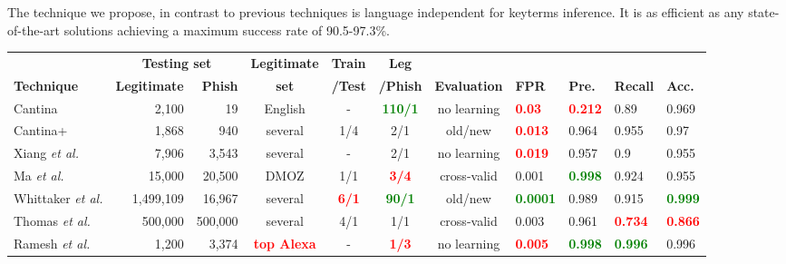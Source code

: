\documentclass[10pt,conference,compsocconf,letterpaper]{IEEEtran}
\begin{document}
The technique we propose, in contrast to previous techniques is language independent for keyterms inference. It is as efficient as any state-of-the-art solutions achieving a maximum success rate of 90.5-97.3\%.
\fi





\else

\begin{table*}[tbh]
\centering
\begin{tabular}{l r r c c c c l l l l }
& \multicolumn{2}{c}{\textbf{Testing set}} & \textbf{Legitimate} & \textbf{Train} & \textbf{Leg} & & & & & \\
\textbf{Technique} &  \textbf{Legitimate} & \textbf{Phish} & \textbf{set} & \textbf{/Test} & \textbf{/Phish}  & \textbf{Evaluation}  & \textbf{FPR}  & \textbf{Pre.} & \textbf{Recall} & \textbf{Acc.}\\ \hline
Cantina \cite{zhang:2007:cantina} & 2,100 & 19 & English & - & \textbf{\textcolor{green}{110/1}} & no learning & \textbf{\textcolor{red}{0.03}} & \textbf{\textcolor{red}{0.212}} & 0.89 & 0.969 \\
Cantina+ \cite{xiang:2011:cantina} & 1,868 & 940 & several & 1/4 & 2/1 & old/new & \textbf{\textcolor{red}{0.013}} & 0.964 & 0.955 & 0.97 \\
Xiang \textit{et al.} \cite{Xiang:2009:hybrid} & 7,906 & 3,543 & several & - & 2/1 & no learning & \textbf{\textcolor{red}{0.019}} & 0.957 & 0.9 & 0.955 \\
Ma \textit{et al.} \cite{Ma:2009:beyond} &  15,000 & 20,500 &  DMOZ & 1/1 & \textbf{\textcolor{red}{3/4}} & cross-valid& 0.001 & \textbf{\textcolor{green}{0.998}} & 0.924 & 0.955 \\
Whittaker \textit{et al.} \cite{whittaker:2010:large} &  1,499,109 & 16,967 & several & \textbf{\textcolor{red}{6/1}} & \textbf{\textcolor{green}{90/1}} & old/new & \textbf{\textcolor{green}{0.0001}} & 0.989 & 0.915 & \textbf{\textcolor{green}{0.999}} \\
Thomas \textit{et al.} \cite{thomas:2011:design} & 500,000 & 500,000 & several & 4/1 & 1/1 & cross-valid & 0.003 & 0.961 & \textbf{\textcolor{red}{0.734}} & \textbf{\textcolor{red}{0.866}} \\
Ramesh \textit{et al.} \cite{ramesh:2014:efficious} & 1,200 & 3,374 & \textbf{\textcolor{red}{top Alexa}} & - & \textbf{\textcolor{red}{1/3}} & no learning & \textbf{\textcolor{red}{0.005}} & \textbf{\textcolor{green}{0.998}}  & \textbf{\textcolor{green}{0.996}} & 0.996 \\

\end{tabular}
\end{table*}
\end{document}
